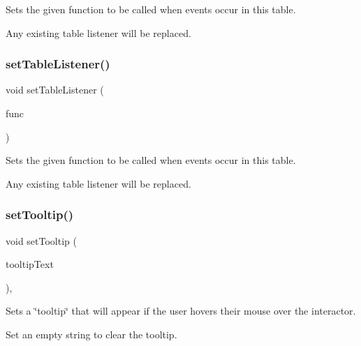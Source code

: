 Sets the given function to be called when events occur in this table. 

Any existing table listener will be replaced. \mbox{\label{classsgl_1_1GTable_a0412cb4e079085ed5cb3bcdf2921ac84}} 
\subsubsection{\texorpdfstring{set\+Table\+Listener()}{setTableListener()}\hspace{0.1cm}{\footnotesize\ttfamily [2/2]}}
{\footnotesize\ttfamily void set\+Table\+Listener (\begin{DoxyParamCaption}\item[{\mbox{\hyperlink{namespacesgl_a54427ce97bb1c2804e4fe2b0a62e8b17}{G\+Event\+Listener\+Void}}}]{func }\end{DoxyParamCaption})\hspace{0.3cm}{\ttfamily [virtual]}}



Sets the given function to be called when events occur in this table. 

Any existing table listener will be replaced. \mbox{\label{classsgl_1_1GInteractor_a039e0e49beaecc275efce02d416acea8}} 
\subsubsection{\texorpdfstring{set\+Tooltip()}{setTooltip()}}
{\footnotesize\ttfamily void set\+Tooltip (\begin{DoxyParamCaption}\item[{const std\+::string \&}]{tooltip\+Text }\end{DoxyParamCaption})\hspace{0.3cm}{\ttfamily [virtual]}, {\ttfamily [inherited]}}



Sets a \char`\"{}tooltip\char`\"{} that will appear if the user hovers their mouse over the interactor. 

Set an empty string to clear the tooltip. \mbox{\label{classsgl_1_1GInteractor_a18e44e30b31525a243960ca3928125aa}} 
